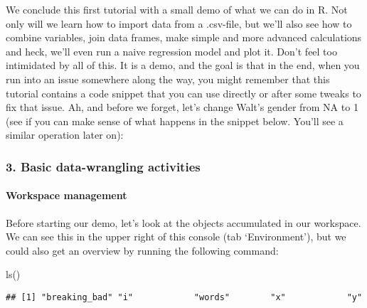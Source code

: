 \documentclass[
]{article}
\newenvironment{Shaded}{\begin{snugshade}}{\end{snugshade}}
\newcommand{\DecValTok}[1]{\textcolor[rgb]{0.00,0.00,0.81}{#1}}
\newcommand{\FunctionTok}[1]{\textcolor[rgb]{0.00,0.00,0.00}{#1}}
\newcommand{\NormalTok}[1]{#1}
\newcommand{\OtherTok}[1]{\textcolor[rgb]{0.56,0.35,0.01}{#1}}
\newcommand{\SpecialCharTok}[1]{\textcolor[rgb]{0.00,0.00,0.00}{#1}}
\newcommand{\StringTok}[1]{\textcolor[rgb]{0.31,0.60,0.02}{#1}}
\begin{document}
We conclude this first tutorial with a small demo of what we can do in
R. Not only will we learn how to import data from a .csv-file, but we'll
also see how to combine variables, join data frames, make simple and
more advanced calculations and heck, we'll even run a naive regression
model and plot it. Don't feel too intimidated by all of this. It is a
demo, and the goal is that in the end, when you run into an issue
somewhere along the way, you might remember that this tutorial contains
a code snippet that you can use directly or after some tweaks to fix
that issue. Ah, and before we forget, let's change Walt's gender from NA
to 1 (see if you can make sense of what happens in the snippet below.
You'll see a similar operation later on):

\begin{Shaded}
\end{Shaded}

\hypertarget{basic-data-wrangling-activities}{%
\subsubsection{3. Basic data-wrangling
activities}\label{basic-data-wrangling-activities}}

\hypertarget{workspace-management}{%
\paragraph{Workspace management}\label{workspace-management}}

Before starting our demo, let's look at the objects accumulated in our
workspace. We can see this in the upper right of this console (tab
`Environment'), but we could also get an overview by running the
following command:

\begin{Shaded}
\begin{Highlighting}[]
\FunctionTok{ls}\NormalTok{()}
\end{Highlighting}
\end{Shaded}

\begin{verbatim}
## [1] "breaking_bad" "i"            "words"        "x"            "y"
\end{verbatim}
\end{document}
